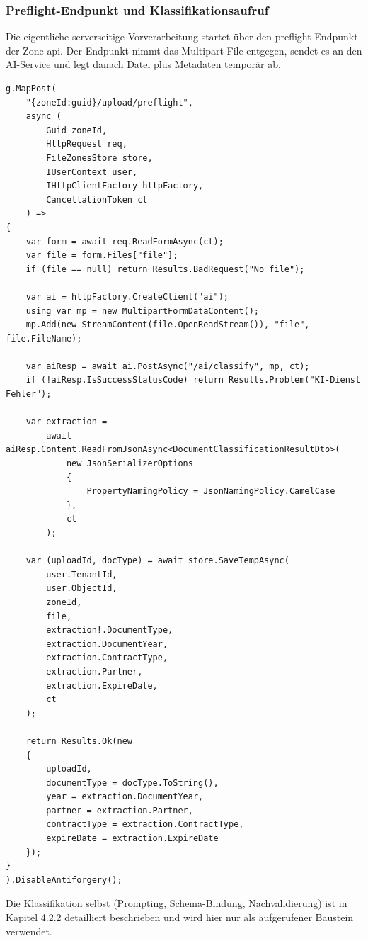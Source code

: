 \subsubsection{Preflight-Endpunkt und Klassifikationsaufruf}

Die eigentliche serverseitige Vorverarbeitung startet über den \gls{preflight}-Endpunkt der Zone-\acrshort{api}. Der Endpunkt nimmt das Multipart-File entgegen, sendet es an den AI-Service und legt danach Datei plus Metadaten temporär ab.

\begin{lstlisting}[language={[Sharp]C},caption={Preflight-Endpunkt im Zone-Service},label={lst:upload-preflight-endpoint}]
g.MapPost(
    "{zoneId:guid}/upload/preflight",
    async (
        Guid zoneId,
        HttpRequest req,
        FileZonesStore store,
        IUserContext user,
        IHttpClientFactory httpFactory,
        CancellationToken ct
    ) =>
{
    var form = await req.ReadFormAsync(ct);
    var file = form.Files["file"];
    if (file == null) return Results.BadRequest("No file");

    var ai = httpFactory.CreateClient("ai");
    using var mp = new MultipartFormDataContent();
    mp.Add(new StreamContent(file.OpenReadStream()), "file", file.FileName);

    var aiResp = await ai.PostAsync("/ai/classify", mp, ct);
    if (!aiResp.IsSuccessStatusCode) return Results.Problem("KI-Dienst Fehler");

    var extraction =
        await aiResp.Content.ReadFromJsonAsync<DocumentClassificationResultDto>(
            new JsonSerializerOptions
            {
                PropertyNamingPolicy = JsonNamingPolicy.CamelCase
            },
            ct
        );

    var (uploadId, docType) = await store.SaveTempAsync(
        user.TenantId,
        user.ObjectId,
        zoneId,
        file,
        extraction!.DocumentType,
        extraction.DocumentYear,
        extraction.ContractType,
        extraction.Partner,
        extraction.ExpireDate,
        ct
    );

    return Results.Ok(new
    {
        uploadId,
        documentType = docType.ToString(),
        year = extraction.DocumentYear,
        partner = extraction.Partner,
        contractType = extraction.ContractType,
        expireDate = extraction.ExpireDate
    });
}
).DisableAntiforgery();
\end{lstlisting}

Die Klassifikation selbst (Prompting, Schema-Bindung, Nachvalidierung) ist in Kapitel 4.2.2 detailliert beschrieben und wird hier nur als aufgerufener Baustein verwendet.

